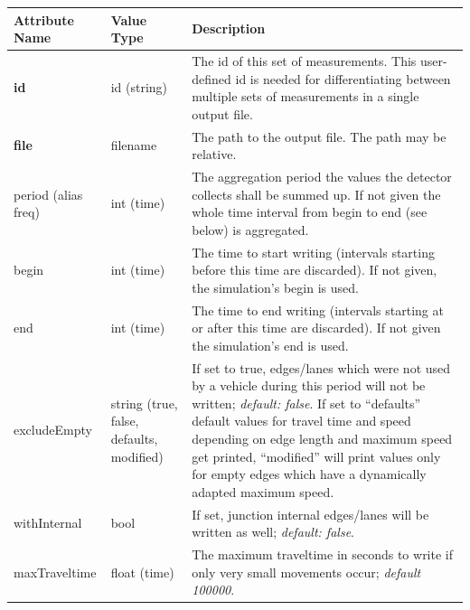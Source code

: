 \documentclass[
  letterpaper,
  DIV=11,
  numbers=noendperiod]{scrreprt}
\newcounter{none} %
\begin{document}
{\def\LTcaptype{none} %
\begin{longtable}[]{@{}
  >{\raggedright\arraybackslash}p{}
  >{\raggedright\arraybackslash}p{}
  >{\raggedright\arraybackslash}p{}@{}}
\toprule\noalign{}
\begin{minipage}[b]{\linewidth}\raggedright
Attribute Name
\end{minipage} & \begin{minipage}[b]{\linewidth}\raggedright
Value Type
\end{minipage} & \begin{minipage}[b]{\linewidth}\raggedright
Description
\end{minipage} \\
\midrule\noalign{}
\endhead
\bottomrule\noalign{}
\endlastfoot
\textbf{id} & id (string) & The id of this set of measurements. This
user-defined id is needed for differentiating between multiple sets of
measurements in a single output file. \\
\textbf{file} & filename & The path to the output file. The path may be
relative. \\
period (alias freq) & int (time) & The aggregation period the values the
detector collects shall be summed up. If not given the whole time
interval from begin to end (see below) is aggregated. \\
begin & int (time) & The time to start writing (intervals starting
before this time are discarded). If not given, the simulation's begin is
used. \\
end & int (time) & The time to end writing (intervals starting at or
after this time are discarded). If not given the simulation's end is
used. \\
excludeEmpty & string (true, false, defaults, modified) & If set to
true, edges/lanes which were not used by a vehicle during this period
will not be written; \emph{default: false}. If set to ``defaults''
default values for travel time and speed depending on edge length and
maximum speed get printed, ``modified'' will print values only for empty
edges which have a dynamically adapted maximum speed. \\
withInternal & bool & If set, junction internal edges/lanes will be
written as well; \emph{default: false}. \\
maxTraveltime & float (time) & The maximum traveltime in seconds to
write if only very small movements occur; \emph{default 100000}. \\

\end{longtable}}
\end{document}
